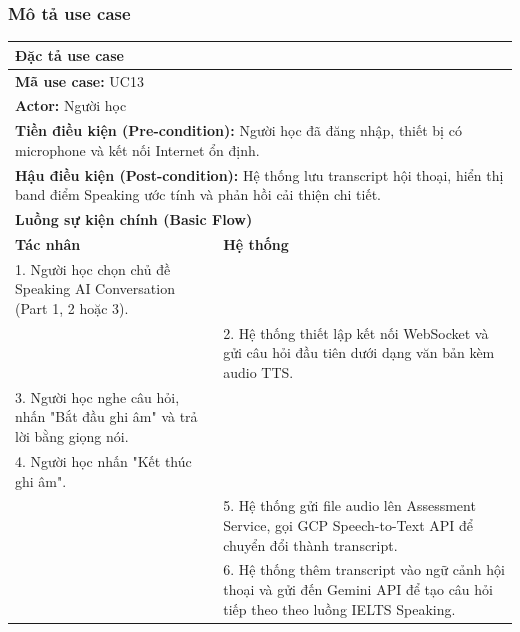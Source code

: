 \documentclass[a4paper,12pt]{extreport}
\begin{document}
\subsubsection{Mô tả use case}
\begin{table}[!ht]
    \centering
    \renewcommand{\arraystretch}{1.1}
    \begin{tabularx}{\linewidth}{|X|X|}
        \hline
        \multicolumn{2}{|l|}{\textbf{Đặc tả use case}} \\ \hline
        \multicolumn{2}{|l|}{\textbf{Mã use case:} UC13} \\ \hline
        \multicolumn{2}{|l|}{\textbf{Actor:} Người học} \\ \hline
        \multicolumn{2}{|p{\dimexpr\linewidth-2\tabcolsep-2\arrayrulewidth}|}{\textbf{Tiền điều kiện (Pre-condition):} Người học đã đăng nhập, thiết bị có microphone và kết nối Internet ổn định.} \\ \hline
        \multicolumn{2}{|p{\dimexpr\linewidth-2\tabcolsep-2\arrayrulewidth}|}{\textbf{Hậu điều kiện (Post-condition):} Hệ thống lưu transcript hội thoại, hiển thị band điểm Speaking ước tính và phản hồi cải thiện chi tiết.} \\ \hline
        \multicolumn{2}{|l|}{\textbf{Luồng sự kiện chính (Basic Flow)}} \\ \hline
        \textbf{Tác nhân} & \textbf{Hệ thống} \\ \hline

        1. Người học chọn chủ đề Speaking AI Conversation (Part 1, 2 hoặc 3). & \\ \hline

        & 2. Hệ thống thiết lập kết nối WebSocket và gửi câu hỏi đầu tiên dưới dạng văn bản kèm audio TTS. \\ \hline

        3. Người học nghe câu hỏi, nhấn "Bắt đầu ghi âm" và trả lời bằng giọng nói. & \\ \hline

        4. Người học nhấn "Kết thúc ghi âm". & \\ \hline

        & 5. Hệ thống gửi file audio lên Assessment Service, gọi GCP Speech-to-Text API để chuyển đổi thành transcript. \\ \hline

        & 6. Hệ thống thêm transcript vào ngữ cảnh hội thoại và gửi đến Gemini API để tạo câu hỏi tiếp theo theo luồng IELTS Speaking. \\ \hline


\end{tabularx}
\end{table}
\end{document}
